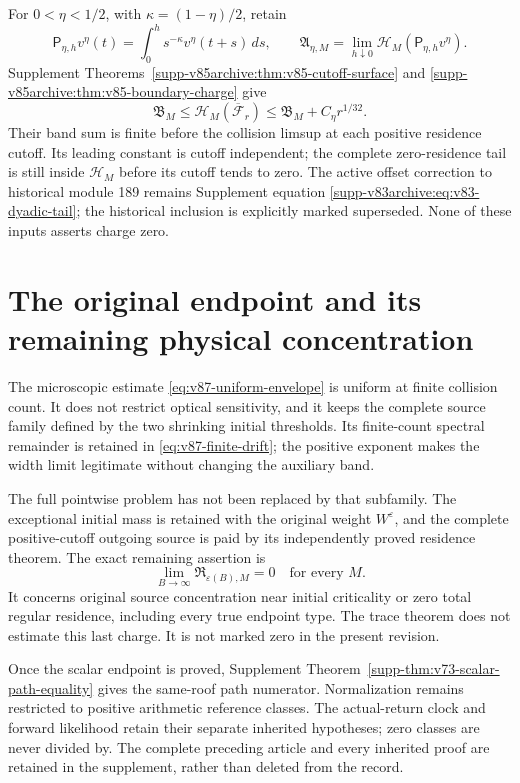 \documentclass[11pt,reqno]{amsart}
\numberwithin{equation}{section}
\theoremstyle{definition}
\theoremstyle{remark}\newtheorem{remark}[theorem]{Remark}
\begin{document}
For $0<\eta<1/2$, with $\kappa=(1-\eta)/2$, retain
\[
 \mathsf P_{\eta,h}v^\eta(t)=\int_0^h s^{-\kappa}v^\eta(t+s)\,ds,
 \qquad\mathfrak A_{\eta,M}
       =\lim_{h\downarrow0}\mathcal H_M(\mathsf P_{\eta,h}v^\eta).
\]
Supplement Theorems~\ref{supp-v85archive:thm:v85-cutoff-surface}
and \ref{supp-v85archive:thm:v85-boundary-charge} give
\begin{equation}\label{eq:v86-surface-input}
 \mathfrak B_M\le\mathcal H_M(\overline{\mathcal F}_r)
                         \le\mathfrak B_M+C_\eta r^{1/32}.
\end{equation}
Their band sum is finite before the collision limsup at each positive
residence cutoff. Its leading constant is cutoff independent; the
complete zero-residence tail is still inside $\mathcal H_M$ before
its cutoff tends to zero. The active offset correction to historical
module 189 remains Supplement equation
\eqref{supp-v83archive:eq:v83-dyadic-tail}; the historical inclusion is
explicitly marked superseded. None of these inputs asserts charge zero.






\section{The original endpoint and its remaining physical concentration}
The microscopic estimate \eqref{eq:v87-uniform-envelope} is uniform
at finite collision count. It does not restrict optical sensitivity,
and it keeps the complete source family defined by the two shrinking
initial thresholds. Its finite-count spectral remainder is retained
in \eqref{eq:v87-finite-drift}; the positive exponent makes the width
limit legitimate without changing the auxiliary band.

The full pointwise problem has not been replaced by that subfamily.
The exceptional initial mass is retained with the original weight
$W^\varepsilon$, and the complete positive-cutoff outgoing source
is paid by its independently proved residence theorem. The exact
remaining assertion is
\[
 \lim_{B\to\infty}\mathfrak R_{\varepsilon(B),M}=0
 \quad\text{for every }M.
\]
It concerns original source concentration near initial criticality or
zero total regular residence, including every true endpoint type.
The trace theorem does not estimate this last charge. It is not marked
zero in the present revision.

Once the scalar endpoint is proved, Supplement
Theorem~\ref{supp-thm:v73-scalar-path-equality} gives the same-roof
path numerator. Normalization remains restricted to positive arithmetic
reference classes. The actual-return clock and forward likelihood
retain their separate inherited hypotheses; zero classes are never
divided by. The complete preceding article and every inherited proof
are retained in the supplement, rather than deleted from the record.

\appendix

\begingroup
\small
\enlargethispage{2\baselineskip}

\endgroup
\end{document}
